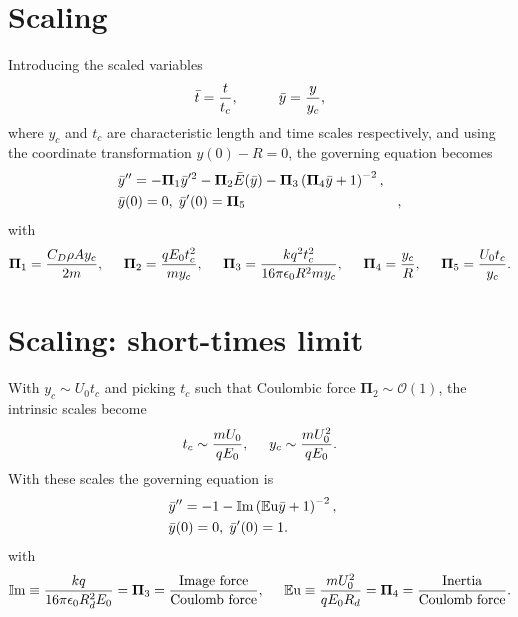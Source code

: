 \documentclass[10pt,a4paper]{article}
\begin{document}
\section*{Scaling}
Introducing the scaled variables
\begin{equation*}
 \bar{t} = \frac{t}{t_c}, \hspace{10 mm} \bar{y} = \frac{y}{y_c}, 
 \end{equation*}
where $y_c$ and $t_c$ are characteristic length and time scales respectively, and using the coordinate transformation $y(0) - R = 0$, the governing equation becomes
\begin{eqnarray*}
& \bar{y}'' = - \mathbf{\Pi}_1 \bar{y}'^2
- \mathbf{\Pi}_2 \bar{E} ( \bar{y} ) 
- \mathbf{\Pi}_3 \left( \mathbf{\Pi}_4  \bar{y} + 1 \right)^{-2}, & \nonumber \\
& \bar{y}(0) = 0, \hspace{1 mm} \bar{y}'(0) = \mathbf{\Pi}_5&, \label{scaled_eqn}
\end{eqnarray*}
with
\[ \mathbf{\Pi}_1 = \frac{C_D \rho A y_c}{2 m}, \hspace{5 mm}
\mathbf{\Pi}_2 = \frac{q E_0 t_c^2}{m y_c}, \hspace{5 mm}
\mathbf{\Pi}_3 = \frac{k q^2 t_c^2}{16 \pi \epsilon_0 R^2 m y_c}, \hspace{5 mm}
\mathbf{\Pi}_4 = \frac{y_c}{R}, \hspace{5 mm}
\mathbf{\Pi}_5 = \frac{U_0 t_c}{y_c}.\]
\section*{Scaling: short-times limit}
With $y_c \sim U_0 t_c$ and picking $t_c$ such that Coulombic force $\mathbf{\Pi}_2 \sim \mathcal{O}(1)$, the intrinsic scales become
\[ t_c \sim \frac{m U_0}{q E_0}, \hspace{5 mm}
y_c \sim \frac{m U_0^2}{q E_0} .
\]
With these scales the governing equation is
\begin{eqnarray*}
& \bar{y}'' = -1 - \mathbb{I}\mbox{m} \left( \mathbb{E}\mbox{u}\bar{y} + 1 \right)^{-2} ,& \nonumber \\
& \bar{y}(0) = 0, \hspace{1 mm} \bar{y}'(0) = 1 .& \label{img_limit}
\end{eqnarray*} 
with 
\[ \mathbb{I}\mbox{m} \equiv \frac{k q}{16 \pi \epsilon_0 R_d^2 E_0} = \mathbf{\Pi}_3 = \frac{\mbox{Image force}}{\mbox{Coulomb force}}, \hspace{5 mm}
\mathbb{E}\mbox{u} \equiv \frac{m U_0^2}{q E_0 R_d} = \mathbf{\Pi}_4 = \frac{\mbox{Inertia}}{\mbox{Coulomb force}}.
\]
\end{document}
